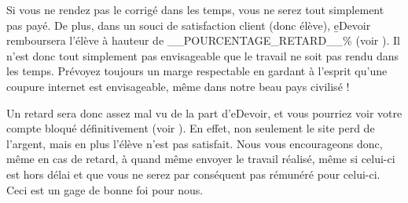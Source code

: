 ﻿Si vous ne rendez pas le corrigé dans les temps, vous ne serez tout simplement pas payé. De plus, dans un souci de satisfaction client (donc élève), \b{eDevoir} remboursera l'élève à hauteur de __POURCENTAGE_RETARD__\% (voir ). Il n'est donc tout simplement pas envisageable que le travail ne soit pas rendu dans les temps. Prévoyez toujours un marge respectable en gardant à l'esprit qu'une coupure internet est envisageable, même dans notre beau pays civilisé !

Un retard sera donc assez mal vu de la part d'eDevoir, et vous pourriez voir votre compte bloqué définitivement (voir ). En effet, non seulement le site perd de l'argent, mais en plus l'élève n'est pas satisfait. Nous vous encourageons donc, même en cas de retard, à quand même envoyer le travail réalisé, même si celui-ci est hors délai et que vous ne serez par conséquent pas rémunéré pour celui-ci. Ceci est un gage de bonne foi pour nous.